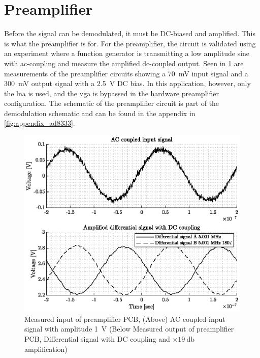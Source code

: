 \section{Preamplifier}
Before the signal can be demodulated, it must be DC-biased and amplified. This is what the preamplifier is for. For the preamplifier, the circuit is validated using an experiment where a function generator is transmitting a low amplitude sine with ac-coupling and measure the amplified dc-coupled output. Seen in \cref{fig:4_preamp_in} are measurements of the preamplifier circuits showing a \qty{70}{\milli\volt} input signal and a \qty{300}{\milli\volt} output signal with a \qty{2.5}{\volt} DC bias. In this application, however, only the \gls{lna} is used, and the \gls{vga} is bypassed in the hardware preamplifier configuration. The schematic of the preamplifier circuit is part of the demodulation schematic and can be found in the appendix in \cref{fig:appendix_ad8333}.
\begin{figure}[htbp]
	\centering
	\includegraphics[width=.8\textwidth]{Figures/4_preamplifier_pcb.eps}
	\caption[Measured input and output of preamplifier PCB]{Measured input of preamplifier PCB, (Above) AC coupled input signal with amplitude \qty{1}{\volt} (Below Measured output of preamplifier PCB, Differential signal with DC coupling and $\times \qty{19}{\decibel}$ amplification)}
	\label{fig:4_preamp_in}
\end{figure}
